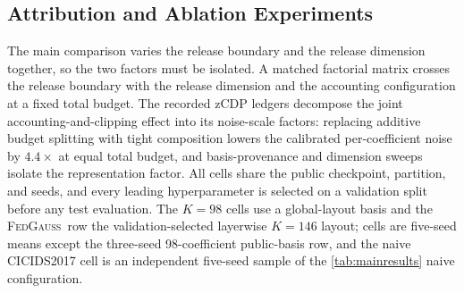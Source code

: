 \documentclass[a4paper,fleqn]{cas-dc}
\newcommand{\method}{\textsc{FedGauss}}
\begin{document}
\subsection{Attribution and Ablation Experiments}
\label{sub:attribution}
\par
The main comparison varies the release boundary and the release dimension
together, so the two factors must be isolated. A matched factorial matrix
crosses the release boundary with the release dimension and the accounting
configuration at a fixed total budget. The recorded zCDP ledgers decompose
the joint accounting-and-clipping effect into its noise-scale factors:
replacing additive budget splitting with tight composition lowers the
calibrated per-coefficient noise by $4.4\times$ at equal total budget, and
basis-provenance and dimension sweeps isolate the representation factor. All
cells share the public checkpoint, partition, and seeds, and every leading
hyperparameter is selected on a validation split before any test evaluation.
The $K=98$ cells use a global-layout basis and the \method\ row the
validation-selected layerwise $K=146$ layout; cells are five-seed means
except the three-seed 98-coefficient public-basis row, and the naive
CICIDS2017 cell is an independent five-seed sample of the
\cref{tab:mainresults} naive configuration.
\par
\par
\end{document}
